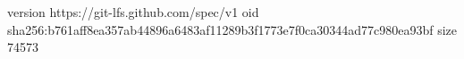version https://git-lfs.github.com/spec/v1
oid sha256:b761aff8ea357ab44896a6483af11289b3f1773e7f0ca30344ad77c980ea93bf
size 74573
